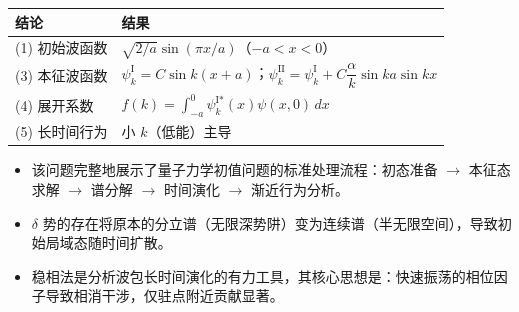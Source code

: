 \begin{formulabox}[答案汇总]
\begin{center}
\begin{tabular}{ll}
\toprule
\textbf{结论} & \textbf{结果} \\
\midrule
(1) 初始波函数 & $\sqrt{2/a}\sin(\pi x/a)$（$-a<x<0$） \\
(3) 本征波函数 & $\psi_k^{\text{I}}=C\sin k(x+a)$；$\psi_k^{\text{II}}=\psi_k^{\text{I}}+C\dfrac{\alpha}{k}\sin ka\sin kx$ \\
(4) 展开系数 & $f(k)=\int_{-a}^{0}\psi_k^{\text{I}*}(x)\psi(x,0)\,dx$ \\
(5) 长时间行为 & 小 $k$（低能）主导 \\
\bottomrule
\end{tabular}
\end{center}
\end{formulabox}

\begin{insightbox}[物理图像]
\begin{itemize}
    \item 该问题完整地展示了量子力学初值问题的标准处理流程：初态准备 $\to$ 本征态求解 $\to$ 谱分解 $\to$ 时间演化 $\to$ 渐近行为分析。
    \item $\delta$ 势的存在将原本的分立谱（无限深势阱）变为连续谱（半无限空间），导致初始局域态随时间扩散。
    \item 稳相法是分析波包长时间演化的有力工具，其核心思想是：快速振荡的相位因子导致相消干涉，仅驻点附近贡献显著。
\end{itemize}
\end{insightbox}

